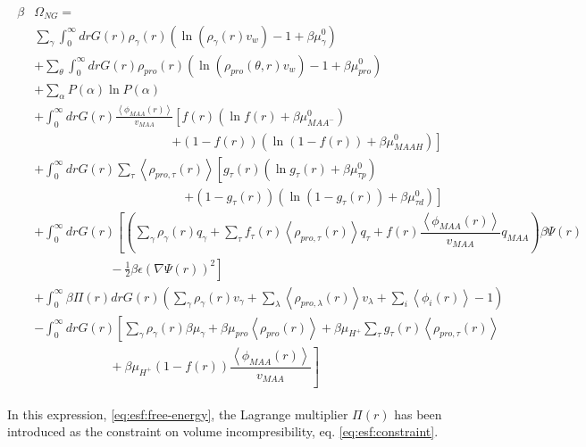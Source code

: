 \begin{align}
	\begin{aligned}
		\beta&\Omega_{NG}=\\&  \sum_{\gamma}\int_0^\infty{dr G(r)\rho_\gamma(r)\left(\ln \left(\rho_\gamma (r)v_w\right) -1 + \beta\mu^0_\gamma\right)} \\
		& +\sum_\theta \int_0^\infty{dr G(r)\rho_{pro}(r)\left(\ln (\rho_{pro}(\theta,r)v_w)-1 + \beta\mu^0_{pro} \right)} \\
		& + \sum_{\alpha}{P(\alpha)\ln P(\alpha)} \\
		& +\int_0^\infty drG(r) \frac{\left<\phi_{MAA}(r)\right>}{v_{MAA}} \left[f(r)(\ln f(r)+ \beta\mu^0_{MAA^-})\right.\\
		&\qquad \qquad \qquad\qquad \qquad \quad \left.+(1-f(r))(\ln (1-f(r))+\beta\mu^0_{MAAH})\right] \\
		& +\int_0^\infty drG(r)\sum_\tau \left<\rho_{pro,\tau}(r)\right> \left[g_\tau(r)(\ln g_\tau(r)+ \beta\mu^0_{\tau p})\right.\\
		&\qquad\qquad \qquad\qquad \qquad \qquad\left.+(1-g_\tau(r))(\ln (1-g_\tau(r))+\beta\mu^0_{\tau d})\right] \\
		& +  \int_0^\infty drG(r)\left[\left(\sum_{\gamma } {\rho_\gamma(r) q_\gamma + \sum_\tau{f_\tau(r) \left<\rho_{pro,\tau}(r)\right> q_\tau} +  f(r)\dfrac{\left<\phi_{MAA}(r)\right>}{v_{MAA}}q_{MAA}}\right)\beta\Psi(r) \right.\\  &\left. \hspace{6em}-\frac{1}{2}\beta\epsilon(\nabla\Psi(r))^2 \right]\\
		&+ \int_0^\infty \beta\Pi(r) drG(r){\left(\sum_{\gamma}\rho_\gamma(r) v_\gamma + \sum_{\lambda}{\left<\rho_{pro,\lambda}(r)\right>}{v_\lambda} + \sum_i\left<\phi_i(r)\right> -1\right)}\\
		& -\int_0^\infty drG(r)\left[\sum_{\gamma }{\rho_\gamma(r)\beta\mu_\gamma}
		+ \beta\mu_{pro} \left<\rho_{pro}(r)\right>
		+\beta\mu_{H^+}\sum_{\tau}{g_\tau(r)\left<\rho_{pro,\tau}(r)\right> } \right.\\
		& \left. \hspace{6em} +\beta\mu_{H^+}(1-f(r))\dfrac{\left<\phi_{MAA}(r)\right>}{v_{MAA}}\right]%
	\end{aligned}
	\label{eq:esf:free-energy}
\end{align}

In this expression, \ref{eq:esf:free-energy}, the Lagrange multiplier $\Pi(r)$ has been introduced as  the constraint on volume incompresibility, eq. \ref{eq:esf:constraint}.


